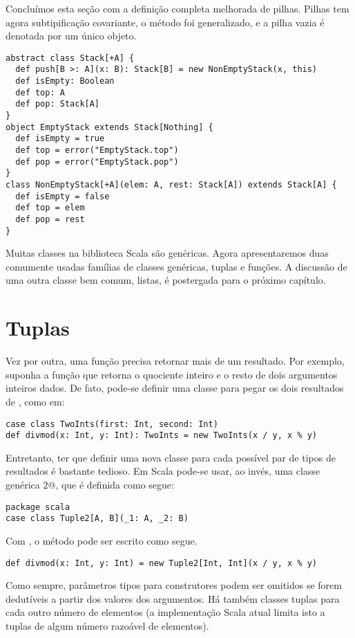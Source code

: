 Concluímos esta seção com a definição completa melhorada de pilhas. Pilhas tem agora subtipificação
covariante, o método  foi generalizado, e a pilha vazia é denotada por um único objeto.
\begin{lstlisting}
abstract class Stack[+A] {
  def push[B >: A](x: B): Stack[B] = new NonEmptyStack(x, this)
  def isEmpty: Boolean
  def top: A
  def pop: Stack[A]
}
object EmptyStack extends Stack[Nothing] {
  def isEmpty = true
  def top = error("EmptyStack.top")
  def pop = error("EmptyStack.pop")
}
class NonEmptyStack[+A](elem: A, rest: Stack[A]) extends Stack[A] {
  def isEmpty = false
  def top = elem
  def pop = rest
}
\end{lstlisting}

Muitas classes na biblioteca Scala são genéricas. Agora apresentaremos duas
comumente usadas famílias de classes genéricas, tuplas e funções. A discussão 
de uma outra classe bem comum, listas, é postergada para o próximo capítulo.

\section{Tuplas}

Vez por outra, uma função precisa retornar mais de um resultado. Por exemplo, suponha a 
função  que retorna o quociente inteiro e o resto de dois argumentos inteiros dados.
De fato, pode-se definir uma classe para pegar os dois resultados de , como em:
\begin{lstlisting}
case class TwoInts(first: Int, second: Int)
def divmod(x: Int, y: Int): TwoInts = new TwoInts(x / y, x % y)
\end{lstlisting}
Entretanto, ter que definir uma nova classe para cada possível par de tipos de resultados é 
bastante tedioso. Em Scala pode-se usar, ao invés, uma classe genérica \lstinline@Tuple$2$@,
que é definida como segue:   
\begin{lstlisting}
package scala
case class Tuple2[A, B](_1: A, _2: B)
\end{lstlisting}
Com , o método  pode ser escrito como segue.
\begin{lstlisting}
def divmod(x: Int, y: Int) = new Tuple2[Int, Int](x / y, x % y)
\end{lstlisting}

Como sempre, parâmetros tipos para construtores podem ser omitidos se forem 
dedutíveis a partir dos valores dos argumentos. Há também classes tuplas para 
cada outro número de elementos (a implementação Scala atual limita isto a tuplas
de algum número razoável de elementos).  

